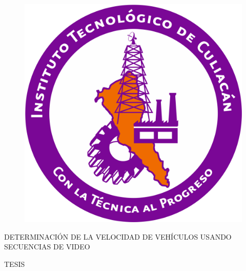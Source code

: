 \begin{titlepage}

    \begin{center}
        
        \vspace*{-0.15cm}
    
        
        \vspace{0.25cm}
        
        \begin{figure}[H]
            \centering
            \includegraphics[scale=0.25]{Portada/logotec.png}
        \end{figure}
        
        \vspace{0.3cm}
        \large{DETERMINACIÓN DE LA VELOCIDAD DE VEHÍCULOS USANDO SECUENCIAS DE VIDEO}
        
        \vspace{0.5cm}
        
        \large{TESIS}
        
        \vspace{-0.2cm}
        

\end{center}
\end{titlepage}
